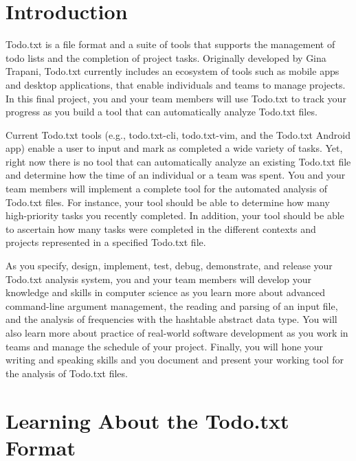 


\usepackage[compact]{titlesec}


\section*{Introduction}

Todo.txt is a file format and a suite of tools that supports the management of todo lists and the completion of project
tasks. Originally developed by Gina Trapani, Todo.txt currently includes an ecosystem of tools such as mobile apps and
desktop applications, that enable individuals and teams to manage projects. In this final project, you and your team
members will use Todo.txt to track your progress as you build a tool that can automatically analyze Todo.txt files.

Current Todo.txt tools (e.g., todo.txt-cli, todo.txt-vim, and the Todo.txt Android app) enable a user to input and mark
as completed a wide variety of tasks.  Yet, right now there is no tool that can automatically analyze an existing
Todo.txt file and determine how the time of an individual or a team was spent. You and your team members will implement
a complete tool for the automated analysis of Todo.txt files.  For instance, your tool should be able to determine how
many high-priority tasks you recently completed.  In addition, your tool should be able to ascertain how many tasks were
completed in the different contexts and projects represented in a specified Todo.txt file. 

As you specify, design, implement, test, debug, demonstrate, and release your Todo.txt analysis system, you and your
team members will develop your knowledge and skills in computer science as you learn more about advanced command-line
argument management, the reading and parsing of an input file, and the analysis of frequencies with the hashtable
abstract data type. You will also learn more about practice of real-world software development as you work in teams and
manage the schedule of your project. Finally, you will hone your writing and speaking skills and you document and
present your working tool for the analysis of Todo.txt files.

\section*{Learning About the Todo.txt Format}

